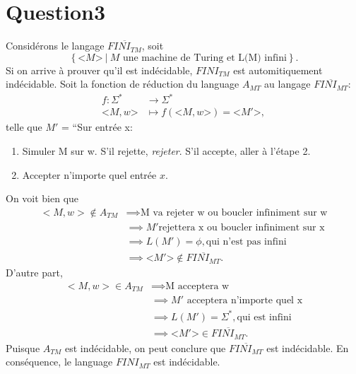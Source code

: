 \documentclass{article}
\begin{document}
\section*{Question3}
Considérons le langage $\overline{FINI_{TM}}$, soit $$\left\{ \text{<}M\text{>} \ |\ M \text{ une machine de Turing et L(M) infini}\right\}. $$ Si on arrive à prouver qu'il est indécidable, $FINI_{TM}$ est automitiquement indécidable. Soit la fonction de réduction du language $A_{MT}$ au langage $\overline{FINI_{MT}}$:
\begin{align*}
	f: \Sigma^{*} &\longrightarrow \Sigma^{*} \\
	 \text{<}M,w\text{>}  &\longmapsto f\left( \text{<}M,w\text{>} \right)= \text{<}M'\text{>}
,\end{align*}
telle que
$M'$ = ``Sur entrée x: 
\begin{enumerate}
\setlength{\itemsep}{-0.5em}
\item  Simuler M sur w. S'il rejette, \textit{rejeter}. S'il accepte, aller à l'étape 2.
\item Accepter n'importe quel entrée $x$. 
\end{enumerate}
On voit bien que
\begin{align*}
	<M,w> \notin  A_{TM} & \implies \text{M va rejeter w ou boucler infiniment sur w}\\
			& \implies M' \text{rejettera x ou boucler infiniment sur x}\\
			& \implies L(M') = \phi ,\text{qui n'est pas infini}\\
			& \implies \text{<}M'\text{>} \not\in \overline{FINI_{MT}}
.\end{align*}
D'autre part,
\begin{align*}
	<M,w> \in  A_{TM} & \implies \text{M acceptera w}\\
			& \implies M' \text{ acceptera n'importe quel x}\\
			& \implies L(M') = \Sigma^{*} ,\text{qui est infini}\\
			& \implies \text{<}M'\text{>} \in \overline{FINI_{MT}}
.\end{align*}
Puisque $A_{TM}$ est indécidable, on peut conclure que $\overline{FINI_{MT}}$ est indécidable. En conséquence, le language $FINI_{MT}$ est indécidable.
\end{document}
